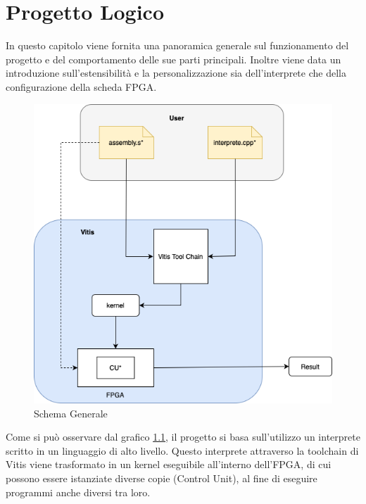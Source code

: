 
\chapter{Progetto Logico}
In questo capitolo viene fornita una panoramica generale sul funzionamento del progetto e del comportamento delle sue parti principali. Inoltre viene data un introduzione sull'estensibilità e la personalizzazione sia dell'interprete che della configurazione della scheda FPGA. 

\vspace{0.2cm}

\begin{figure}[h!]
    \centering
    \includegraphics[scale=0.6]{images/Capitolo3/5_im.png}
    \caption{Schema Generale}
    \label{Graficogenerale}
\end{figure}

\clearpage

Come si può osservare dal grafico \ref{Graficogenerale}, il progetto si basa sull'utilizzo un interprete scritto in un linguaggio di alto livello. Questo interprete attraverso la toolchain di Vitis viene trasformato in un kernel eseguibile all'interno dell'FPGA, di cui possono essere istanziate diverse copie (Control Unit), al fine di eseguire programmi anche diversi tra loro.

\vspace{1cm}

